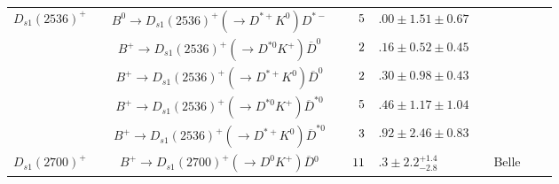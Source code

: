 \begin{adjustbox}{width=\textwidth,center}
{\begin{tabular}{cp{5pt}cp{5pt}r@{}lp{5pt}cp{5pt}c}
	\multirow{2}{*}{$D_{s1}(2536)^{+}$}	&&	\multirow{1}{*}{$B^{0}\to D_{s1}(2536)^{+}(\to D^{*+}K^{0})D^{*-}$}	&\cellcolor{LightGray} &$	\cellcolor{LightGray} 5$&\cellcolor{LightGray}$.00\pm1.51\pm0.67	$&\cellcolor{LightGray}&	\cellcolor{LightGray} \babar{}	&\cellcolor{LightGray}&	\cite{Aubert:2007rva}         \\ \cmidrule{3-9}
		&&	\multirow{1}{*}{$B^{+}\to D_{s1}(2536)^{+}(\to D^{*0}K^{+})\overline{D}^{0}$}	&\cellcolor{LightGray} &$	\cellcolor{LightGray} 2$&\cellcolor{LightGray}$.16\pm0.52\pm0.45	$&\cellcolor{LightGray}&	\cellcolor{LightGray} \babar{}	&\cellcolor{LightGray}&	\cite{Aubert:2007rva}         \\ \cmidrule{3-9}
		&&	\multirow{1}{*}{$B^{+}\to D_{s1}(2536)^{+}(\to D^{*+}K^{0})\overline{D}^{0}$}	&\cellcolor{LightGray} &$	\cellcolor{LightGray} 2$&\cellcolor{LightGray}$.30\pm0.98\pm0.43	$&\cellcolor{LightGray}&	\cellcolor{LightGray} \babar{}	&\cellcolor{LightGray}&	\cite{Aubert:2007rva}         \\ \cmidrule{3-9}
		&&	\multirow{1}{*}{$B^{+}\to D_{s1}(2536)^{+}(\to D^{*0}K^{+})\overline{D}^{*0}$}	&\cellcolor{LightGray} &$	\cellcolor{LightGray} 5$&\cellcolor{LightGray}$.46\pm1.17\pm1.04	$&\cellcolor{LightGray}&	\cellcolor{LightGray} \babar{}	&\cellcolor{LightGray}&	\cite{Aubert:2007rva}         \\ \cmidrule{3-9}
		&&	\multirow{1}{*}{$B^{+}\to D_{s1}(2536)^{+}(\to D^{*+}K^{0})\overline{D}^{*0}$}	&\cellcolor{LightGray} &$	\cellcolor{LightGray} 3$&\cellcolor{LightGray}$.92\pm2.46\pm0.83	$&\cellcolor{LightGray}&	\cellcolor{LightGray} \babar{}	&\cellcolor{LightGray}&	\cite{Aubert:2007rva}         \\ \midrule
	\multirow{1}{*}{$D_{s1}(2700)^{+}$}	&&	\multirow{1}{*}{$B^{+}\to D_{s1}(2700)^{+}(\to D^{0}K^{+})\overline{D}{}^{0}$}	&\cellcolor{LightGray} &$	\cellcolor{LightGray}  11$&\cellcolor{LightGray}$.3\pm2.2{}^{+1.4}_{-2.8}	$&\cellcolor{LightGray}&	\cellcolor{LightGray}  Belle	&\cellcolor{LightGray}&	\cite{Brodzicka:2007aa}       \\ \bottomrule
\end{tabular}
}
\end{adjustbox}
